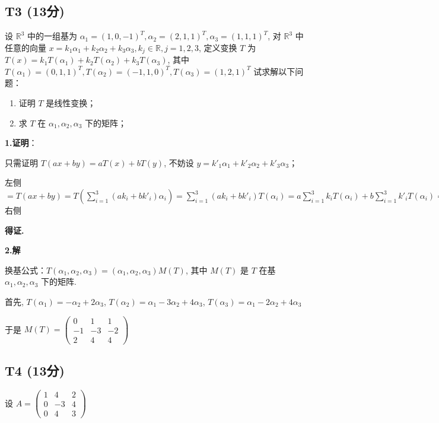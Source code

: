 \documentclass{article}
\begin{document}
\subsection{T3 (13分)}

\par 设 $\mathbb R^3$ 中的一组基为 $\alpha_1=(1, 0, -1)^T, \alpha_2=(2, 1, 1)^T, \alpha_3=(1, 1, 1)^T$, 对 $\mathbb R^3$ 中任意的向量 $x=k_1\alpha_1 + k_2\alpha_2+k_3\alpha_3, k_j\in\mathbb R, j=1, 2, 3$, 定义变换 $T$ 为 $T(x)=k_1T(\alpha_1)+k_2T(\alpha_2)+k_3T(\alpha_3)$, 其中 $T(\alpha_1)=(0, 1, 1)^T, T(\alpha_2)=(-1, 1, 0)^T, T(\alpha_3)=(1, 2, 1)^T$ 试求解以下问题：

\begin{enumerate}
	\item 证明 $T$ 是线性变换；
	\item 求 $T$ 在 $\alpha_1, \alpha_2, \alpha_3$ 下的矩阵；
\end{enumerate}

\par \textbf{1.证明}：

只需证明 $T(ax + by)=aT(x)+bT(y)$, 不妨设 $y=k'_1\alpha_1+k'_2\alpha_2+k'_3\alpha_3$；

左侧 $=T(ax+by)=T(\sum_{i=1}^3(ak_i + bk'_i)\alpha_i)=\sum_{i=1}^3(ak_i + bk'_i)T(\alpha_i)=a\sum_{i=1}^3k_iT(\alpha_i)+b\sum_{i=1}^3 k'_iT(\alpha_i)=$ 右侧

\textbf{得证.}

\par \textbf{2.解}

换基公式：$T(\alpha_1, \alpha_2, \alpha_3)=(\alpha_1, \alpha_2, \alpha_3) M(T)$, 其中 $M(T)$ 是 $T$ 在基 $\alpha_1, \alpha_2, \alpha_3$ 下的矩阵.

首先, $T(\alpha_1)=-\alpha_2+2\alpha_3$, $T(\alpha_2)=\alpha_1-3\alpha_2+4\alpha_3$,  $T(\alpha_3)=\alpha_1-2\alpha_2+4\alpha_3$

于是 $M(T)=\begin{pmatrix}
	0 & 1 & 1\\
	-1 & -3 & -2\\
	2 & 4 & 4
\end{pmatrix}$

\subsection{T4 (13分)}

\par 设 $A=\begin{pmatrix}
	1 & 4 & 2\\
	0 & -3 & 4\\
	0 & 4 & 3
\end{pmatrix}$
\end{document}
